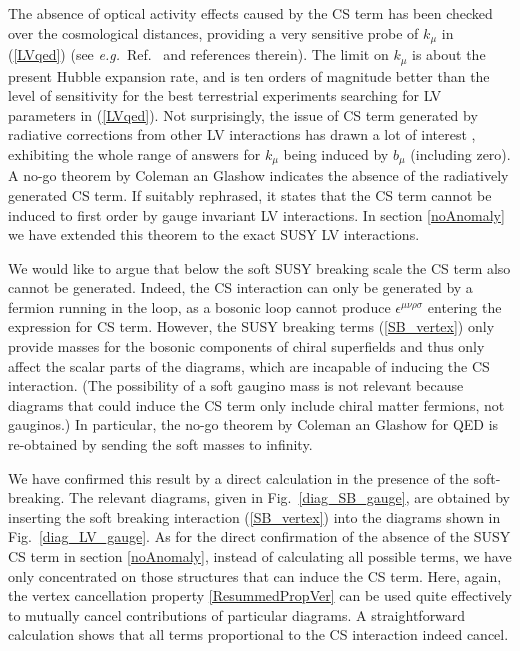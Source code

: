 \documentclass[12pt]{revtex4}
\begin{document}
 
The absence of optical activity effects caused by the CS term has been
checked over the cosmological distances, providing 
a very sensitive probe of $k_\mu$ in (\ref{LVqed}) (see {\em e.g.}\ 
Ref.~\cite{CFJ} and references therein). The limit on $k_\mu$ is about
the present Hubble expansion rate, and is ten orders of magnitude
better than the level of sensitivity for the best terrestrial
experiments searching for LV parameters in (\ref{LVqed}). Not
surprisingly, the issue of CS term generated by radiative corrections
from other LV interactions has drawn a lot of interest
\cite{CG,Jackiw:1999yp,Chung:1998jv,Andrianov:2001zj,Perez-Victoria:2001ej},
exhibiting the whole range of answers for $k_\mu$ being induced by
$b_\mu$ (including 
zero). A no-go theorem by Coleman an Glashow \cite{CG}
indicates the absence of the radiatively generated CS
term. If suitably rephrased, it states that the CS term
cannot be induced to first order by gauge invariant LV interactions. 
In section \ref{noAnomaly} we have extended this theorem to the exact
SUSY LV interactions. 


We would like to argue that below the soft SUSY breaking scale the CS term also 
cannot be generated. Indeed, the CS interaction can only be generated
by a fermion running in the loop, as a bosonic loop cannot produce 
$ \epsilon^{\mu\nu\rho\sigma} $ entering the expression for CS term. 
However, the SUSY breaking terms (\ref{SB_vertex}) only 
provide masses for the bosonic components of chiral superfields
and thus only affect the scalar parts of the diagrams, which are 
incapable of inducing the CS interaction. (The possibility of a
soft gaugino mass is not relevant because diagrams that could induce
the CS term only include chiral matter fermions, not gauginos.) 
In particular, the no-go theorem by Coleman an Glashow \cite{CG} for
QED is re-obtained by sending the soft masses to infinity. 


We have confirmed this result by a direct calculation in the presence of
the soft-breaking. The relevant diagrams, given in
Fig.~\ref{diag_SB_gauge}, are obtained by inserting the soft breaking
interaction (\ref{SB_vertex}) into the diagrams shown in
Fig.~\ref{diag_LV_gauge}. As for the direct confirmation of the
absence of the SUSY CS term in section \ref{noAnomaly}, instead of
calculating all possible terms, we have only concentrated on those
structures that can induce the CS term. Here, again, the vertex
cancellation property \eqref{ResummedPropVer} can be used quite
effectively to mutually cancel contributions of particular diagrams.
A straightforward calculation shows that all terms proportional to the
CS interaction indeed cancel. 
\end{document}
